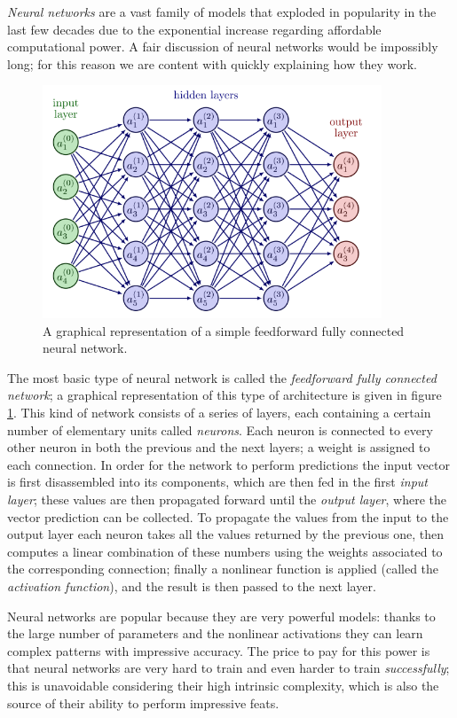 \emph{Neural networks} are a vast family of models that exploded in popularity in the last few decades due to the exponential increase regarding affordable computational power. A fair discussion of neural networks would be impossibly long; for this reason we are content with quickly explaining how they work.

\begin{figure}[H]
    \centering
    \includegraphics[width=0.9\textwidth]{img/neural_network.png}
    \caption{A graphical representation of a simple feedforward fully connected neural network.}
    \label{fig:neural_network}
\end{figure}
The most basic type of neural network is called the \emph{feedforward fully connected network}; a graphical representation of this type of architecture is given in figure \ref{fig:neural_network}.
This kind of network consists of a series of layers, each containing a certain number of elementary units called \emph{neurons}. Each neuron is connected to every other neuron in both the previous and the next layers; a weight is assigned to each connection.
In order for the network to perform predictions the input vector is first disassembled into its components, which are then fed in the first \emph{input layer}; these values are then propagated forward until the \emph{output layer}, where the vector prediction can be collected. 
To propagate the values from the input to the output layer each neuron takes all the values returned by the previous one, then computes a linear combination of these numbers using the weights associated to the corresponding connection; finally a nonlinear function is applied (called the \emph{activation function}), and the result is then passed to the next layer.

Neural networks are popular because they are very powerful models: thanks to the large number of parameters and the nonlinear activations they can learn complex patterns with impressive accuracy. The price to pay for this power is that neural networks are very hard to train and even harder to train \emph{successfully}; this is unavoidable considering their high intrinsic complexity, which is also the source of their ability to perform impressive feats.

